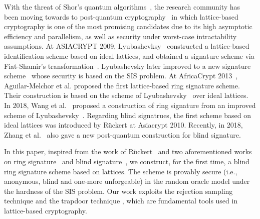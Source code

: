 \documentclass[runningheads]{llncs}
\begin{document}
With the threat of Shor's quantum algorithms~\cite{Sho97}, the research community has been moving towards to post-quantum cryptography~\cite{BBD08} in which lattice-based cryptography is one of the most promising candidates due to its high asymptotic efficiency and parallelism, as well as security under worst-case intractability assumptions. At ASIACRYPT 2009, Lyubashevksy~\cite{Lyu09} constructed a lattice-based identification scheme based on ideal lattices, and obtained a signature scheme via Fiat-Shamir's transformation~\cite{FS86}. %
 Lyubashevsky later improved to a new signature scheme~\cite{Lyu12} whose security is based on the \textsf{SIS} problem. 
At AfricaCrypt 2013~\cite{ABB+13}, Aguilar-Melchor et al. proposed the first lattice-based ring signature scheme. Their construction is based on the scheme of Lyubashevsky~\cite{Lyu09} over ideal lattices. In 2018, Wang et al.~\cite{WZZ18} proposed a construction of ring signature from an improved scheme of Lyubashevsky~\cite{Lyu12}. 
Regarding blind signatrues, the first scheme based on ideal lattices was introduced by R\"uckert \cite{Ruc10} at Asiacrypt 2010. Recently, in 2018, Zhang et al.~\cite{ZJZ+18} also gave a new post-quantum construction for blind signature. %

In this paper, inspired from the work of R\"uckert~\cite{Ruc10} and two aforementioned works on ring signature~\cite{WZZ18} and blind signature~\cite{ZJZ+18}, we construct, for the first time, a blind ring signature scheme based on lattices. The  scheme is provably secure (i.e., anonymous, blind and one-more unforgeable) in the random oracle model under the hardness of the \textsf{SIS} problem. Our work exploits the rejection sampling technique \cite{Lyu12} and the trapdoor technique \cite{GPV08}, which are fundamental tools used in lattice-based cryptography. 
\end{document}

